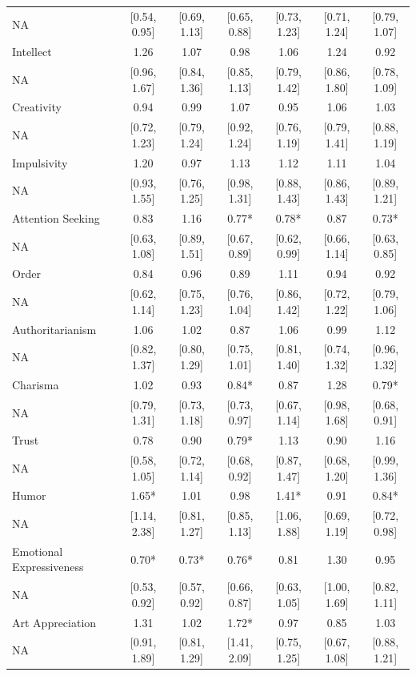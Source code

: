 \documentclass[man]{apa6}
\begin{document}
\begin{center}
\begin{ThreePartTable}
{\begin{longtable}{lcccccc}
NA & [0.54, 0.95] & [0.69, 1.13] & [0.65, 0.88] & [0.73, 1.23] & [0.71, 1.24] & [0.79, 1.07]\\
Intellect & 1.26 & 1.07 & 0.98 & 1.06 & 1.24 & 0.92\\
NA & [0.96, 1.67] & [0.84, 1.36] & [0.85, 1.13] & [0.79, 1.42] & [0.86, 1.80] & [0.78, 1.09]\\
Creativity & 0.94 & 0.99 & 1.07 & 0.95 & 1.06 & 1.03\\
NA & [0.72, 1.23] & [0.79, 1.24] & [0.92, 1.24] & [0.76, 1.19] & [0.79, 1.41] & [0.88, 1.19]\\
Impulsivity & 1.20 & 0.97 & 1.13 & 1.12 & 1.11 & 1.04\\
NA & [0.93, 1.55] & [0.76, 1.25] & [0.98, 1.31] & [0.88, 1.43] & [0.86, 1.43] & [0.89, 1.21]\\
Attention Seeking & 0.83 & 1.16 & 0.77* & 0.78* & 0.87 & 0.73*\\
NA & [0.63, 1.08] & [0.89, 1.51] & [0.67, 0.89] & [0.62, 0.99] & [0.66, 1.14] & [0.63, 0.85]\\
Order & 0.84 & 0.96 & 0.89 & 1.11 & 0.94 & 0.92\\
NA & [0.62, 1.14] & [0.75, 1.23] & [0.76, 1.04] & [0.86, 1.42] & [0.72, 1.22] & [0.79, 1.06]\\
Authoritarianism & 1.06 & 1.02 & 0.87 & 1.06 & 0.99 & 1.12\\
NA & [0.82, 1.37] & [0.80, 1.29] & [0.75, 1.01] & [0.81, 1.40] & [0.74, 1.32] & [0.96, 1.32]\\
Charisma & 1.02 & 0.93 & 0.84* & 0.87 & 1.28 & 0.79*\\
NA & [0.79, 1.31] & [0.73, 1.18] & [0.73, 0.97] & [0.67, 1.14] & [0.98, 1.68] & [0.68, 0.91]\\
Trust & 0.78 & 0.90 & 0.79* & 1.13 & 0.90 & 1.16\\
NA & [0.58, 1.05] & [0.72, 1.14] & [0.68, 0.92] & [0.87, 1.47] & [0.68, 1.20] & [0.99, 1.36]\\
Humor & 1.65* & 1.01 & 0.98 & 1.41* & 0.91 & 0.84*\\
NA & [1.14, 2.38] & [0.81, 1.27] & [0.85, 1.13] & [1.06, 1.88] & [0.69, 1.19] & [0.72, 0.98]\\
Emotional Expressiveness & 0.70* & 0.73* & 0.76* & 0.81 & 1.30 & 0.95\\
NA & [0.53, 0.92] & [0.57, 0.92] & [0.66, 0.87] & [0.63, 1.05] & [1.00, 1.69] & [0.82, 1.11]\\
Art Appreciation & 1.31 & 1.02 & 1.72* & 0.97 & 0.85 & 1.03\\
NA & [0.91, 1.89] & [0.81, 1.29] & [1.41, 2.09] & [0.75, 1.25] & [0.67, 1.08] & [0.88, 1.21]\\

\end{longtable}}
\end{ThreePartTable}
\end{center}
\end{document}
